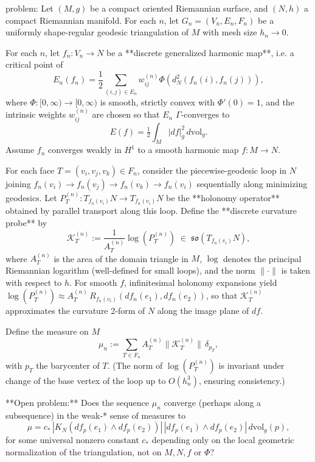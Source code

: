 problem:  
Let \( (M,g) \) be a compact oriented Riemannian surface, and \( (N,h) \) a compact Riemannian manifold.  
For each \( n \), let \( G_n = (V_n,E_n,F_n) \) be a uniformly shape-regular geodesic triangulation of \( M \) with mesh size \( h_n \to 0 \).  

For each \( n \), let \( f_n : V_n \to N \) be a **discrete generalized harmonic map**, i.e. a critical point of  
\[
E_n(f_n) = \frac{1}{2}\sum_{(i,j)\in E_n} w_{ij}^{(n)} \Phi\!\left(d_N^2(f_n(i), f_n(j))\right),
\]
where \( \Phi:[0,\infty)\to[0,\infty) \) is smooth, strictly convex with \( \Phi'(0)=1 \), and the intrinsic weights \(w_{ij}^{(n)}\) are chosen so that \(E_n\) $\Gamma$‑converges to  
\[
E(f) = \tfrac{1}{2}\int_M |df|_g^2\,d\mathrm{vol}_g .
\]
Assume \( f_n \) converges weakly in \(H^1\) to a smooth harmonic map \(f:M\to N\).

For each face \(T=(v_i,v_j,v_k)\in F_n\), consider the piecewise-geodesic loop in \(N\) joining 
\( f_n(v_i)\to f_n(v_j)\to f_n(v_k)\to f_n(v_i) \) sequentially along minimizing geodesics.  
Let \( P_T^{(n)}: T_{f_n(v_i)}N \to T_{f_n(v_i)}N\) be the **holonomy operator** obtained by parallel transport along this loop.  
Define the **discrete curvature probe** by
\[
\mathcal{K}_T^{(n)} := \frac{1}{A_T^{(n)}} \log(P_T^{(n)}) \;\in\; \mathfrak{so}(T_{f_n(v_i)}N),
\]
where \(A_T^{(n)}\) is the area of the domain triangle in \(M\),  
\(\log\) denotes the principal Riemannian logarithm (well-defined for small loops),  
and the norm \(\|\cdot\|\) is taken with respect to \(h\).  
For smooth \(f\), infinitesimal holonomy expansions yield
\(\log(P_T^{(n)}) \approx A_T^{(n)}\,R_{f_n(v_i)}(df_n(e_1),df_n(e_2))\),  
so that \( \mathcal{K}_T^{(n)} \) approximates the curvature 2‑form of \(N\) along the image plane of \(df\).

Define the measure on \(M\)
\[
\mu_n := \sum_{T\in F_n} A_T^{(n)} \big\| \mathcal{K}_T^{(n)} \big\|\, \delta_{p_T},
\]
with \(p_T\) the barycenter of \(T\).  (The norm of \(\log(P_T^{(n)})\) is invariant under change of the base vertex of the loop up to \(O(h_n^3)\), ensuring consistency.)

**Open problem:**  
Does the sequence \(\mu_n\) converge (perhaps along a subsequence) in the weak‑* sense of measures to  
\[
\mu = c_*\, |K_N(df_p(e_1)\wedge df_p(e_2))|\, |\!df_p(e_1)\wedge df_p(e_2)\!|\,d\mathrm{vol}_g(p),
\]
for some universal nonzero constant \(c_*\) depending only on the local geometric normalization of the triangulation, not on \(M,N,f\) or \(\Phi\)?  

